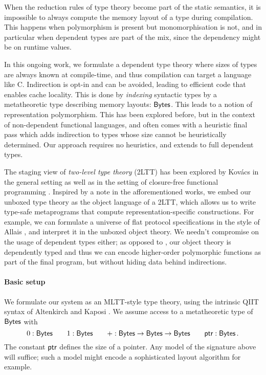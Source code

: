 When the reduction rules of type theory become part of the static semantics, it
is impossible to always compute the memory layout of a type during compilation.
This happens when polymorphism is present but monomorphisation is not, and in
particular when dependent types are part of the mix, since the dependency might
be on runtime values.

In this ongoing work, we formulate a dependent type theory where sizes of types
are always known at compile-time, and thus compilation can target a language
like C. Indirection is opt-in and can be avoided, leading to efficient code that
enables cache locality. This is done by \emph{indexing} syntactic types by a
metatheoretic type describing memory layouts: $\textsf{Bytes}$. This leads to a notion
of representation polymorphism. This has been explored before, but in the
context of non-dependent functional languages, and often comes with a heuristic
final pass which adds indirection to types whose size cannot be heuristically
determined. Our approach requires no heuristics, and extends to full dependent
types.

The staging view of \emph{two-level type theory} (2LTT) \cite{Annenkov2023-vk}
has been explored by Kov\'acs in the general setting \cite{Kovacs2022-rf} as
well as in the setting of closure-free functional programming
\cite{Kovacs2024-hn}. Inspired by a note in the afforementioned works, we embed
our unboxed type theory as the object language of a 2LTT, which allows us to
write type-safe metaprograms that compute representation-specific constructions.
For example, we can formulate a universe of flat protocol specifications in the
style of Allais \cite{Allais2023-zq}, and interpret it in the unboxed object
theory. We needn't compromise on the usage of dependent types either; as opposed
to \cite{Kovacs2024-hn}, our object theory is dependently typed and thus we can
encode higher-order polymorphic functions as part of the final program, but
without hiding data behind indirections.

\paragraph{Basic setup}
We formulate our system as an MLTT-style type theory, using the intrinsic QIIT
syntax of Altenkirch and Kaposi \cite{Altenkirch2016-zc}.
We assume access to a metatheoretic type of
\(\textsf{Bytes}\) with
\[
0 : \textsf{Bytes} \qquad 1 : \textsf{Bytes} \qquad + : \textsf{Bytes} \to \textsf{Bytes} \to \textsf{Bytes} \qquad \textsf{ptr} : \textsf{Bytes} \,.
\]
The constant \(\textsf{ptr}\) defines the size of a pointer. Any model of
the signature above will suffice; such a model might encode a sophisticated
layout algorithm for example.

